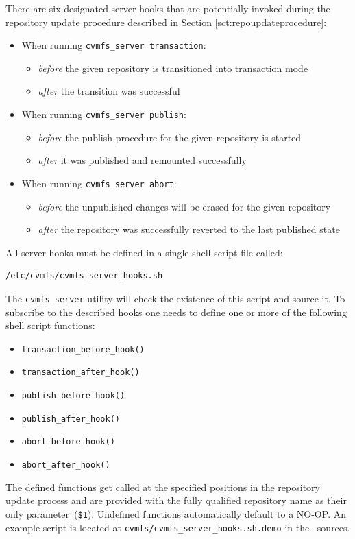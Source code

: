 There are six designated server hooks that are potentially invoked during the repository update procedure described in Section \ref{sct:repoupdateprocedure}:
\begin{itemize}
	\item When running \texttt{cvmfs\_server transaction}:
	\begin{itemize}
		\item \emph{before} the given repository is transitioned into transaction mode
		\item \emph{after} the transition was successful
	\end{itemize}
	\item When running \texttt{cvmfs\_server publish}:
	\begin{itemize}
		\item \emph{before} the publish procedure for the given repository is started
		\item \emph{after} it was published and remounted successfully
	\end{itemize}
	\item When running \texttt{cvmfs\_server abort}:
	\begin{itemize}
		\item \emph{before} the unpublished changes will be erased for the given repository
		\item \emph{after} the repository was successfully reverted to the last published state
	\end{itemize}
\end{itemize}
All server hooks must be defined in a single shell script file called:
\begin{verbatim}
/etc/cvmfs/cvmfs_server_hooks.sh
\end{verbatim}
The \texttt{cvmfs\_server} utility will check the existence of this script and source it.
To subscribe to the described hooks one needs to define one or more of the following shell script functions:
\begin{itemize}
	\setlength{\itemsep}{1pt}
	\item \texttt{transaction\_before\_hook()}
	\item \texttt{transaction\_after\_hook()}
\end{itemize}
\begin{itemize}
	\item \texttt{publish\_before\_hook()}
	\item \texttt{publish\_after\_hook()}
\end{itemize}
\begin{itemize}
	\item \texttt{abort\_before\_hook()}
	\item \texttt{abort\_after\_hook()}
\end{itemize}
The defined functions get called at the specified positions in the repository update process and are provided with the fully qualified repository name as their only parameter~(\texttt{\$1}).
Undefined functions automatically default to a NO-OP.
An example script is located at \texttt{cvmfs/cvmfs\_server\_hooks.sh.demo} in the \cvmfs\ sources.


